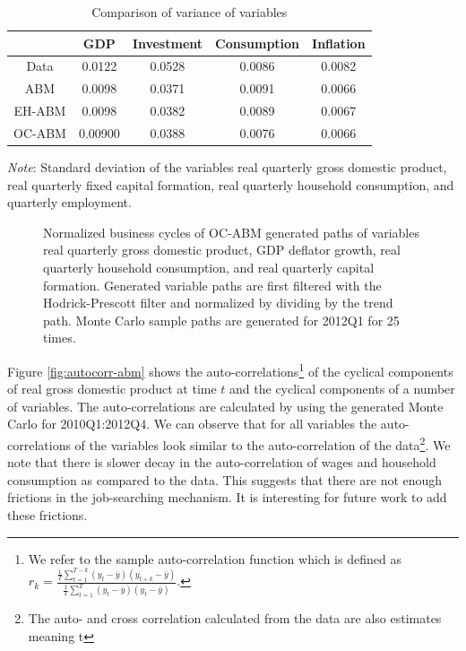\begin{table}[h!]
    \centering
    \caption{Comparison of variance of variables}
    \begin{tabular}{c|cccc}
    \toprule
         &GDP &Investment&Consumption& Inflation \\
         \midrule 
        Data &0.0122&0.0528& 0.0086 & 0.0082 \\ \midrule
        ABM &0.0098& 0.0371 &0.0091&0.0066\\
        EH-ABM &0.0098&0.0382&0.0089&0.0067\\
        OC-ABM &0.00900 &0.0388 & 0.0076& 0.0066\\
    \bottomrule
    \end{tabular}
    	\begin{tablenotes}
		\footnotesize \item \textit{Note}: Standard deviation of the variables real quarterly gross domestic product, real quarterly fixed capital formation, real quarterly household consumption, and quarterly employment. 
	\end{tablenotes}
    \label{tab:std}
\end{table}

\begin{figure}[!h]
    \centering
    
    \caption{Normalized business cycles of OC-ABM generated paths of variables real quarterly gross domestic product, GDP deflator growth, real quarterly household consumption, and real quarterly capital formation. Generated variable paths are first filtered with the Hodrick-Prescott filter and normalized by dividing by the trend path. Monte Carlo sample paths are generated for 2012Q1 for 25 times.}
    \label{fig:cycles-abm}
\end{figure}
Figure \ref{fig:autocorr-abm} shows the auto-correlations\footnote{We refer to the sample auto-correlation function which is defined as 
$r_k=\frac{\frac{1}{T} \sum_{t=1}^{T-k}\left(y_t-\bar{y}\right)\left(y_{t+k}-\bar{y}\right)}{\frac{1}{T} \sum_{t=1}^{T}\left(y_t-\bar{y}\right)\left(y_{t}-\bar{y}\right)}
$.} of the cyclical components of real gross domestic product at time $t$ and the cyclical components of a number of variables. The auto-correlations are calculated by using the generated Monte Carlo for 2010Q1:2012Q4. We can observe that for all variables the auto-correlations of the variables look similar to the auto-correlation of the data\footnote{The auto- and cross correlation calculated from the data are also estimates meaning t}. We note that there is slower decay in the auto-correlation of wages and household consumption as compared to the data. This suggests that there are not enough frictions in the job-searching mechanism. It is interesting for future work to add these frictions. \\ 

